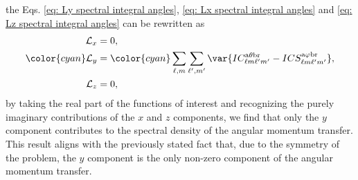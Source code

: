 \vspace{-0.3 cm}
the Eqs. \eqref{eq: Ly spectral integral angles}, \eqref{eq: Lx spectral integral angles} and \eqref{eq: Lz spectral integral angles} can be rewritten as
%
\begin{align}
\mathcal{L}_x &= 
0, \label{eq: Lx spectral integral angles solved} \\
% 
\color{cyan}\mathcal{L}_y &= 
\color{cyan}\sum_{\ell, m} \sum_{\ell^{\prime}, m^{\prime}}
\var{IC_{\ell m \ell^{\prime} m^{\prime}}^{\rm a \theta b r} - 
ICS_{\ell m \ell^{\prime} m^{\prime}}^{\rm a \varphi b r}}, \label{eq: Ly spectral integral angles solved} \\
%
\mathcal{L}_z &= 
0, \label{eq: Lz spectral integral angles solved}
\end{align}
%
by  taking the real part of the functions of interest and recognizing the purely imaginary contributions of the $x$ and $z$ components, we find that only the $y$ component contributes to the spectral density of the angular momentum transfer. This result aligns with the previously stated fact that, due to the symmetry of the problem, the $y$ component is the only non-zero component of the angular momentum transfer.

